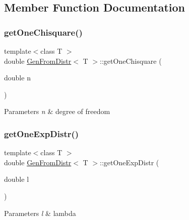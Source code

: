 \subsection{Member Function Documentation}
\hypertarget{classGenFromDistr_ad9d10783cc324b3376a078808ba1331b}{}\label{classGenFromDistr_ad9d10783cc324b3376a078808ba1331b} 
\subsubsection{\texorpdfstring{get\+One\+Chisquare()}{getOneChisquare()}}
{\footnotesize\ttfamily template$<$class T $>$ \\
double \hyperlink{classGenFromDistr}{Gen\+From\+Distr}$<$ T $>$\+::get\+One\+Chisquare (\begin{DoxyParamCaption}\item[{double}]{n }\end{DoxyParamCaption})\hspace{0.3cm}{\ttfamily [inline]}}


\begin{DoxyParams}{Parameters}
{\em n} & degree of freedom \\
\hline
\end{DoxyParams}
\hypertarget{classGenFromDistr_ada0a44362ef21afe2926620f3af489fd}{}\label{classGenFromDistr_ada0a44362ef21afe2926620f3af489fd} 
\subsubsection{\texorpdfstring{get\+One\+Exp\+Distr()}{getOneExpDistr()}}
{\footnotesize\ttfamily template$<$class T $>$ \\
double \hyperlink{classGenFromDistr}{Gen\+From\+Distr}$<$ T $>$\+::get\+One\+Exp\+Distr (\begin{DoxyParamCaption}\item[{double}]{l }\end{DoxyParamCaption})\hspace{0.3cm}{\ttfamily [inline]}}


\begin{DoxyParams}{Parameters}
{\em l} & lambda \\
\hline
\end{DoxyParams}
\hypertarget{classGenFromDistr_a163dfedc722d8f808ccaae299523db5a}{}\label{classGenFromDistr_a163dfedc722d8f808ccaae299523db5a} 

